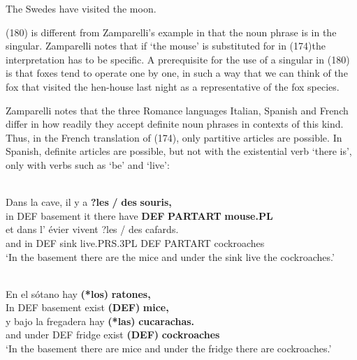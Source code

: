 \ea
\gl \label{bkm:Ref94431191}The Swedes have visited the moon.  
 \z


	 (180) is different from Zamparelli’s example in that the noun phrase is in the singular. Zamparelli notes that if  ‘the mouse’ is substituted for in (174)\textstyleLinguisticExample{, }the interpretation has to be specific. A prerequisite for the use of a singular in (180) is that foxes tend to operate one by one, in such a way that we can think of the fox that visited the hen-house last night as a representative of the fox species. 


Zamparelli notes that the three Romance languages Italian, Spanish and French differ in how readily they accept definite noun phrases in contexts of this kind. Thus, in the French translation of (174), only partitive articles are possible. In Spanish, definite articles are possible, but not with the existential verb  ‘there is’, only with verbs such as  ‘be’ and  ‘live’:


\ea \label{} 
\\
\gll Dans  la  cave,  il  y  a  \textbf{?les} \textbf{/} \textbf{des} \textbf{souris,}\\
in  DEF  basement  it  there  have  \textbf{DEF}  \textbf{PARTART} \textbf{mouse.PL}\\
\gll et  dans  l’  évier  vivent  ?les  /  des  cafards.\\
and  in  DEF  sink  live.PRS.3PL  DEF    PARTART  cockroaches\\
\glt ‘In the basement there are the mice and under the sink live the cockroaches.’ 

\z

\ea \label{} 
\\
\gll En  el  sótano  hay  \textbf{(*los)} \textbf{  ratones,}\\
In  DEF  basement  exist  \textbf{(DEF)} \textbf{mice,}\\
\gll y  bajo  la  fregadera  hay  \textbf{(*las)} \textbf{cucarachas.}\\
and  under  DEF  fridge  exist  \textbf{(DEF)} \textbf{cockroaches}\\
\glt ‘In the basement there are mice and under the fridge there are cockroaches.’  

